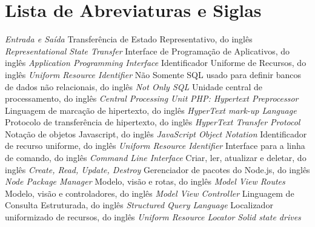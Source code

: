 \chapter*{Lista de Abreviaturas e Siglas}


\begin{acronym}
 {\textit{Entrada e Saída}}
 {Transferência de Estado Representativo, do inglês \textit{Representational State Transfer}}
 {Interface de Programação de Aplicativos, do inglês \textit{Application Programming Interface}}
 {Identificador Uniforme de Recursos, do inglês \textit{Uniform Resource Identifier}}
 {Não Somente SQL usado para definir bancos de dados não relacionais, do inglês \textit{Not Only SQL}}
 {Unidade central de processamento, do inglês \textit{Central Processing Unit}}
 {\textit{PHP: Hypertext Preprocessor}}
 {Linguagem de marcação de hipertexto, do inglês \textit{HyperText mark-up Language}}
 {Protocolo de transferência de hipertexto, do inglês \textit{HyperText Transfer Protocol}}
 {Notação de objetos Javascript, do inglês \textit{JavaScript Object Notation}}
 {Identificador de recurso uniforme, do inglês \textit{Uniform Resource Identifier}}
 {Interface para a linha de comando, do inglês \textit{Command Line Interface}}
 {Criar, ler, atualizar e deletar, do inglês \textit{Create, Read, Update, Destroy}}
 {Gerenciador de pacotes do Node.js, do inglês \textit{Node Package Manager}}
 {Modelo, visão e rotas, do inglês \textit{Model View Routes}}
 {Modelo, visão e controladores, do inglês \textit{Model View Controller}}
 {Linguagem de Consulta Estruturada, do inglês \textit{Structured Query Language}}
 {Localizador uniformizado de recursos, do inglês \textit{Uniform Resource Locator}}
 {\textit{Solid state drives}}


\end{acronym}
